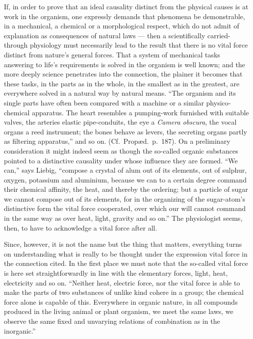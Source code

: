 \documentclass[12pt,a4paper]{book}
\begin{document}
\setcounter{footnote}{0}
If, in order to prove that an ideal causality distinct from the physical causes
is at work in the organism, one expressly demands that phenomena be
demonstrable, in a mechanical, a chemical or a morphological respect, which do
not admit of explanation as consequences of natural laws --- then a
scientifically carried-through physiology must necessarily lead to the result
that there is no vital force distinct from nature's general forces. That a
system of mechanical tasks answering to life's requirements is solved in the
organism is well known; and the more deeply science penetrates into the
connection, the plainer it becomes that these tasks, in the parts as in the
whole, in the smallest as in the greatest, are everywhere solved in a natural
way by natural means. ``The organism and its single parts have often been
compared with a machine or a similar physico-chemical apparatus. The heart
resembles a pumping-work furnished with suitable valves, the arteries elastic
pipe-conduits, the eye a \textit{Camera obscura}, the vocal organs a reed
instrument; the bones behave as levers, the secreting organs partly as
filtering apparatus,'' and so on. (Cf.\ Propæd.\ p.~187).
On a preliminary consideration it might indeed seem as though the so-called
organic substances pointed to a distinctive causality under whose influence
they are formed. ``We can,'' says Liebig, ``compose a crystal of alum out of
its elements, out of sulphur, oxygen, potassium and aluminium, because we can
to a certain degree command their chemical affinity, the heat, and thereby the
ordering; but a particle of sugar we cannot compose out of its elements, for in
the organizing of the sugar-atom's distinctive form the vital force
cooperated, over which our will cannot command in the same way as over heat,
light, gravity and so on.'' The physiologist seems, then, to have to
acknowledge a vital force after all.

Since, however, it is not the name but the thing that matters, everything turns
on understanding what is really to be thought under the expression vital force
in the connection cited. In the first place we must note that the so-called
vital force is here set straightforwardly in line with the elementary forces,
light, heat, electricity and so on. ``Neither heat, electric force, nor the
vital force is able to make the parts of two substances of unlike kind cohere
in a group; the chemical force alone is capable of this. Everywhere in organic
nature, in all compounds produced in the living animal or plant organism, we
meet the same laws, we observe the same fixed and unvarying relations of
combination as in the inorganic.''
\end{document}
